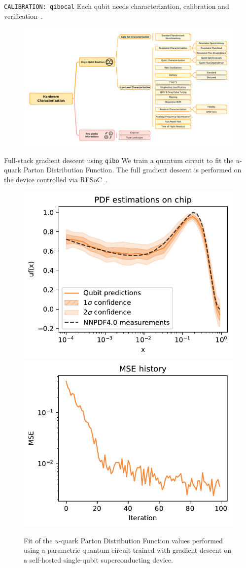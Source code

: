 \documentclass[20pt, final]{beamer}
\newlength{\colwidth}
\begin{document}
\begin{frame}[t]
\begin{columns}[t]
\begin{column}{\colwidth}
  \begin{block}{\texttt{CALIBRATION: qibocal}}
  Each qubit needs characterization, calibration and verification~\cite{pasquale2023opensource}.
  \begin{figure}
    \includegraphics[width=1  \textwidth]{figures/qibocal.pdf}
  \end{figure}
  \end{block}

  \begin{block}{Full-stack gradient descent using \texttt{qibo}}
  We train a quantum circuit to fit the $u$-quark Parton Distribution Function. 
  The full gradient descent
  is performed on the device controlled via RFSoC~\cite{efthymiou2023qibolab}.

  \begin{figure}
    \includegraphics[width=0.5  \textwidth]{figures/qpdf.pdf}%
    \includegraphics[width=0.5  \textwidth]{figures/loss.pdf}
    \caption{Fit of the $u$-quark Parton Distribution Function values performed 
    using a parametric quantum circuit trained with gradient descent on a self-hosted 
    single-qubit superconducting device.}
  \end{figure}
  \end{block}


\end{column}
\end{columns}
\end{frame}
\end{document}

